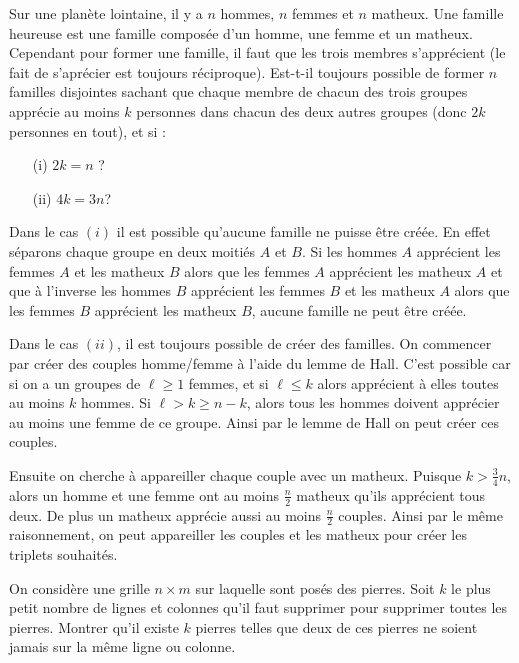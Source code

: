 \begin{exo}

Sur une planète lointaine, il y a $n$ hommes, $n$ femmes et $n$ matheux. Une famille heureuse est une famille composée d'un homme, une femme et un matheux. Cependant pour former une famille, il faut que les trois membres s'apprécient (le fait de s'aprécier est toujours réciproque). Est-t-il toujours possible de former $n$ familles disjointes sachant que chaque membre de chacun des trois groupes apprécie au moins $k$ personnes dans chacun des deux autres groupes (donc $2k$ personnes en tout), et si :

\begin{itemize}
\item[(i)] $2k=n$ ?
\item[(ii)] $4k=3n$?
\end{itemize}
\end{exo}

\begin{sol}

Dans le cas $(i)$ il est possible qu'aucune famille ne puisse être créée. En effet séparons chaque groupe en deux moitiés $A$ et $B$. Si les hommes $A$ apprécient les femmes $A$ et les matheux $B$ alors que les femmes $A$ apprécient les matheux $A$ et que à l'inverse les hommes $B$ apprécient les femmes $B$ et les matheux $A$ alors que les femmes $B$ apprécient les matheux $B$, aucune famille ne peut être créée.

\medskip

Dans le cas $(ii)$, il est toujours possible de créer des familles. On commencer par créer des couples homme/femme à l'aide du lemme de Hall. C'est possible car si on a un groupes de $\ell\geq 1$ femmes, et si $\ell\leq k$ alors apprécient à elles toutes au moins $k$ hommes. Si $\ell>k\geq n-k$, alors tous les hommes doivent apprécier au moins une femme de ce groupe. Ainsi par le lemme de Hall on peut créer ces couples.

\medskip
Ensuite on cherche à appareiller chaque couple avec un matheux. Puisque $k>\frac{3}{4}n$, alors un homme et une femme ont au moins $\frac{n}{2}$ matheux qu'ils apprécient tous deux. De plus un matheux apprécie aussi au moins $\frac{n}{2}$ couples. Ainsi par le même raisonnement, on peut appareiller les couples et les matheux pour créer les triplets souhaités.
\end{sol}

\begin{exo}
On considère une grille $n\times m$ sur laquelle sont posés des pierres. Soit $k$ le plus petit nombre de lignes et colonnes qu'il faut supprimer pour supprimer toutes les pierres. Montrer qu'il existe $k$ pierres telles que deux de ces pierres ne soient jamais sur la même ligne ou colonne.
\end{exo}

